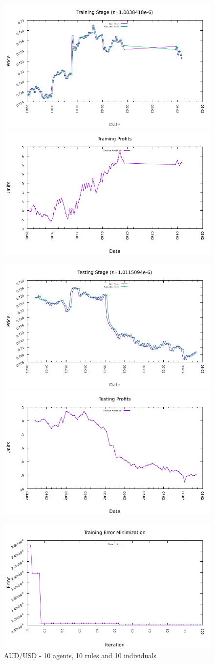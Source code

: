 \begin{figure}[htp]
  \centering

  \includegraphics[width=.45\textwidth]{img/plots/aud_usd_h1-10agents-10rules-10ind-100gen_training_fit.pdf}\quad
  \includegraphics[width=.45\textwidth]{img/plots/aud_usd_h1-10agents-10rules-10ind-100gen_training_profits.pdf}

  \medskip

  \includegraphics[width=.45\textwidth]{img/plots/aud_usd_h1-10agents-10rules-10ind-100gen_testing_fit.pdf}\quad
  \includegraphics[width=.45\textwidth]{img/plots/aud_usd_h1-10agents-10rules-10ind-100gen_testing_profits.pdf}

  \medskip

  \includegraphics[width=.45\textwidth]{img/plots/aud_usd_h1-10agents-10rules-10ind-100gen_error_minimization.pdf}

  \caption{AUD/USD - 10 agents, 10 rules and 10 individuals}
  \label{figure:aud-usd-10agents-10rules-10individuals}
\end{figure}

